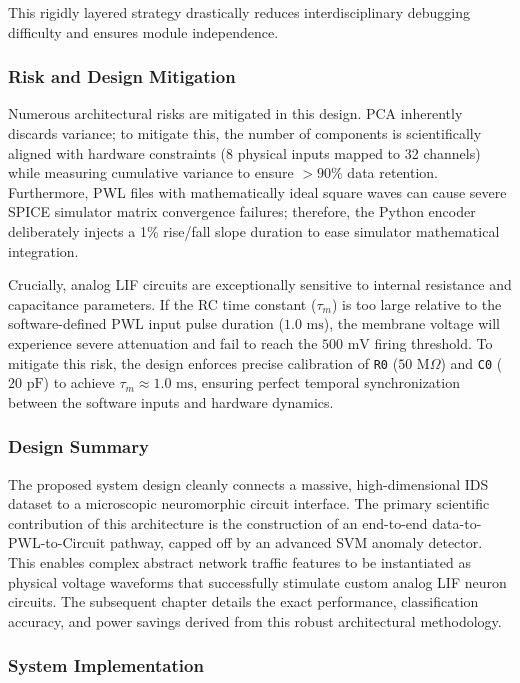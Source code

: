 \documentclass{ieeeaccess}
\begin{document}
This rigidly layered strategy drastically reduces interdisciplinary debugging difficulty and ensures module independence.

\subsubsection{Risk and Design Mitigation}

Numerous architectural risks are mitigated in this design. PCA inherently discards variance; to mitigate this, the number of components is scientifically aligned with hardware constraints (8 physical inputs mapped to 32 channels) while measuring cumulative variance to ensure $>90\%$ data retention. Furthermore, PWL files with mathematically ideal square waves can cause severe SPICE simulator matrix convergence failures; therefore, the Python encoder deliberately injects a 1\% rise/fall slope duration to ease simulator mathematical integration. 

Crucially, analog LIF circuits are exceptionally sensitive to internal resistance and capacitance parameters. If the RC time constant ($\tau_m$) is too large relative to the software-defined PWL input pulse duration ($1.0\text{ ms}$), the membrane voltage will experience severe attenuation and fail to reach the $500\text{ mV}$ firing threshold. To mitigate this risk, the design enforces precise calibration of \texttt{R0} ($50\text{ M}\Omega$) and \texttt{C0} ($20\text{ pF}$) to achieve $\tau_m \approx 1.0\text{ ms}$, ensuring perfect temporal synchronization between the software inputs and hardware dynamics.

\subsubsection{Design Summary}

The proposed system design cleanly connects a massive, high-dimensional IDS dataset to a microscopic neuromorphic circuit interface. The primary scientific contribution of this architecture is the construction of an end-to-end data-to-PWL-to-Circuit pathway, capped off by an advanced SVM anomaly detector. This enables complex abstract network traffic features to be instantiated as physical voltage waveforms that successfully stimulate custom analog LIF neuron circuits. The subsequent chapter details the exact performance, classification accuracy, and power savings derived from this robust architectural methodology.


\subsubsection{System Implementation}
\end{document}
